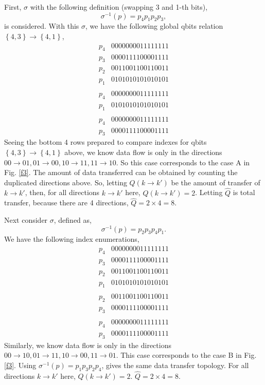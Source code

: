 \documentclass[a4paper]{article}
\newcommand{\cbr}[1]{\left\{#1\right\}}
\begin{document}
First, \(\sigma\) with the following definition (swapping 3 and 1-th bits),
\begin{equation}
    \label{es3}
\sigma^{-1}(p) = p_4 p_1 p_2 p_3,
\end{equation}
is considered. With this \(\sigma\), we have the following global qbits relation \(\cbr{4, 3}\to\cbr{4, 1}\), 
\[
\begin{matrix}
    p_4& 0000000011111111\\
    p_3& 0000111100001111\\
    p_2& 0011001100110011\\
    p_1& 0101010101010101\\
    \\
    p_4&0000000011111111\\
    p_1&0101010101010101\\
    \\
    p_4&0000000011111111\\
    p_3&0000111100001111
\end{matrix}
\]
Seeing the bottom 4 rows prepared to compare indexes for qbits \(\cbr{4, 3}\to\cbr{4, 1}\) above, we know data flow is only in the directions \(00\to 01, 01\to 00, 10\to 11, 11\to 10\). So this case corresponds to the case A in Fig. \ref{f3}. The amount of data transferred can be obtained by counting the duplicated directions above. So, letting \(Q(k\to k')\) be the amount of transfer of \(k\to k'\), then, for all directions \(k\to k'\) here, \(Q(k\to k') = 2\). Letting \(\hat{Q}\) is total transfer, because there are 4 directions, \(\hat{Q} = 2\times 4 = 8\).

Next consider \(\sigma\), defined as,
\begin{equation}
    \label{es4}
\sigma^{-1}(p) = p_2 p_3 p_4 p_1.
\end{equation}
We have the following index enumerations,
\[
\begin{matrix}
    p_4& 0000000011111111\\
    p_3& 0000111100001111\\
    p_2& 0011001100110011\\
    p_1& 0101010101010101\\
    \\
    p_2&0011001100110011\\
    p_3&0000111100001111\\
    \\
    p_4&0000000011111111\\
    p_3&0000111100001111
\end{matrix}
\]
Similarly, we know data flow is only in the directions \(00\to 10, 01\to 11, 10\to 00, 11\to 01\). This case corresponds to the case B in Fig. \ref{f3}. Using \(\sigma^{-1}(p) =  p_1 p_3 p_2 p_4\), gives the same data transfer topology. For all directions \(k\to k'\) here, \(Q(k\to k') = 2\). \(\hat{Q} = 2\times 4 = 8\).
\end{document}

